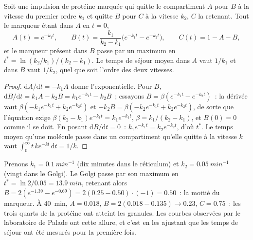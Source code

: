 \begin{theorem}\label{thm:b3:membrane-traffic:pulse-chase}
Soit une impulsion de protéine marquée qui quitte le compartiment $A$
pour $B$ à la vitesse du premier ordre $k_{1}$ et quitte $B$ pour $C$ à
la vitesse $k_{2}$, $C$ la retenant. Tout le marqueur étant dans $A$ en
$t = 0$,
\[
A(t) = e^{-k_{1}t},\qquad
B(t) = \frac{k_{1}}{k_{2} - k_{1}}\bigl(e^{-k_{1}t} - e^{-k_{2}t}\bigr),
\qquad
C(t) = 1 - A - B,
\]
et le marqueur présent dans $B$ passe par un maximum en
$t^{*} = \ln(k_{2}/k_{1})/(k_{2} - k_{1})$. Le temps de séjour moyen
dans $A$ vaut $1/k_{1}$ et dans $B$ vaut $1/k_{2}$, quel que soit
l'ordre des deux vitesses.
\end{theorem}
\begin{proof}
$\mathrm{d}A/\mathrm{d}t = -k_{1}A$ donne l'exponentielle. Pour $B$,
$\mathrm{d}B/\mathrm{d}t = k_{1}A - k_{2}B = k_{1}e^{-k_{1}t} - k_{2}B$~;
essayons $B = \beta(e^{-k_{1}t} - e^{-k_{2}t})$~: la dérivée vaut
$\beta(-k_{1}e^{-k_{1}t} + k_{2}e^{-k_{2}t})$ et $-k_{2}B = \beta(-k_{2}
e^{-k_{1}t} + k_{2}e^{-k_{2}t})$, de sorte que l'équation exige $\beta(k_{2}
- k_{1})e^{-k_{1}t} = k_{1}e^{-k_{1}t}$, $\beta = k_{1}/(k_{2} -
k_{1})$, et $B(0) = 0$ comme il se doit. En posant
$\mathrm{d}B/\mathrm{d}t =
0$~: $k_{1}e^{-k_{1}t} = k_{2}e^{-k_{2}t}$, d'où $t^{*}$. Le temps moyen
qu'une molécule passe dans un compartiment qu'elle quitte à la vitesse
$k$ vaut $\int_{0}^{
\infty} t\,k e^{-kt}\,\mathrm{d}t = 1/k$.
\end{proof}

\begin{example}\label{ex:b3:membrane-traffic:palade}
Prenons $k_{1} = \qty{0.1}{min^{-1}}$ (dix minutes dans le réticulum) et
$k_{2} = \qty{0.05}{min^{-1}}$ (vingt dans le Golgi). Le Golgi passe par
son maximum en $t^{*} = \ln 2/0.05 = \qty{13.9}{min}$, retenant alors
$B = 2(e^{-1.39} -
e^{-0.69}) = 2(0.25 - 0.50)\cdot(-1) = 0.50$~: la moitié du marqueur. À
\qty{40}{min}, $A = 0.018$, $B = 2(0.018 - 0.135) \to 0.23$, $C = 0.75$~:
les trois quarts de la protéine ont atteint les granules. Les courbes
observées par le laboratoire de Palade ont cette allure, et c'est en
les ajustant que les temps de séjour ont été mesurés pour la première
fois.
\end{example}

